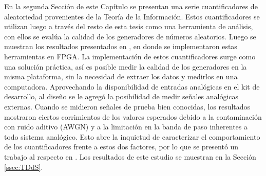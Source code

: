 En la segunda Sección de este Capítulo se presentan una serie cuantificadores de aleatoriedad provenientes de la Teoría de la Información.
Estos cuantificadores se utilizan luego a través del resto de esta tesis como una herramienta de análisis, con ellos se evalúa la calidad de los generadores de números aleatorios.
Luego se muestran los resultados presentados en \cite{Antonelli2016}, en donde se implementaron estas herramientas en FPGA.
La implementación de estos cuantificadores surge como una solución práctica, así es posible medir la calidad de los generadores en la misma plataforma, sin la necesidad de extraer los datos y medirlos en una computadora.
Aprovechando la disponibilidad de entradas analógicas en el kit de desarrollo, al diseño se le agregó la posibilidad de medir señales analógicas externas.
Cuando se midieron señales de prueba bien conocidas, los resultados mostraron ciertos corrimientos de los valores esperados debido a la contaminación con ruido aditivo (AWGN) y a la limitación en la banda de paso inherentes a todo sistema analógico.
Esto abre la inquietud de caracterizar el comportamiento de los cuantificadores frente a estos dos factores, por lo que se presentó un trabajo al respecto en \cite{TREFEMAC2016}.
Los resultados de este estudio se muestran en la Sección \ref{ssec:TDdS}.